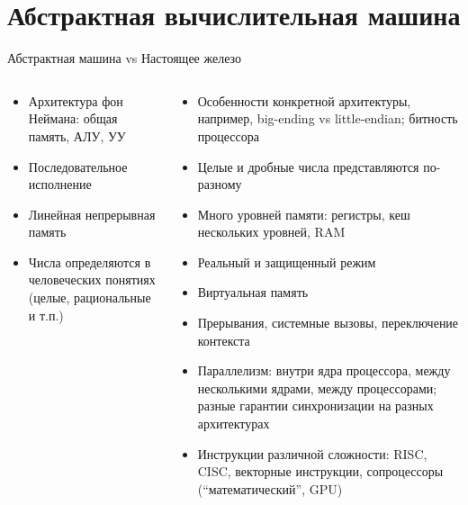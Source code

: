 \documentclass[unknownkeysallowed,xcolor=table]{beamer}
\begin{document}
\section{Абстрактная вычислительная машина}

\begin{frame}[t]{Абстрактная машина vs Настоящее железо}
\scriptsize
\begin{columns}[t]
\begin{column}{0.5\textwidth}
  \begin{itemize}
    \item Архитектура фон Неймана: общая память, АЛУ, УУ
    \item Последовательное исполнение
    \item Линейная непрерывная память
    \item Числа определяются в человеческих понятиях (целые, рациональные и т.п.)
  \end{itemize}
\end{column}
\begin{column}{0.5\textwidth}
  \begin{itemize}
    \item Особенности конкретной архитектуры, например, big-ending vs little-endian; битность процессора
    \item Целые и дробные числа представляются по-разному
    \item Много уровней памяти: регистры, кеш нескольких уровней, RAM
    \item Реальный и защищенный режим
    \item Виртуальная память
    \item Прерывания, системные вызовы, переключение контекста
    \item Параллелизм: внутри ядра процессора, между несколькими ядрами, между процессорами; разные гарантии синхронизации на разных архитектурах
    \item Инструкции различной сложности: RISC, CISC, векторные инструкции, сопроцессоры (“математический”, GPU)
  \end{itemize}
\end{column}
\end{columns}
\normalsize
\end{frame}
\end{document}
